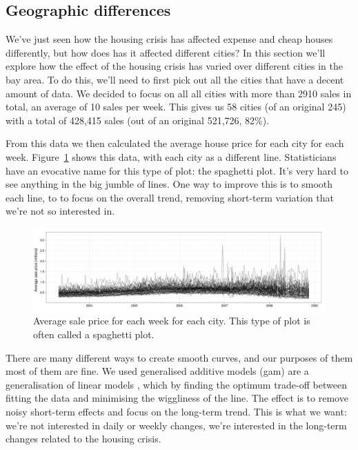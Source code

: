 \documentclass[oneside]{article}
\begin{document}
\subsection{Geographic differences}

We've just seen how the housing crisis has affected expense and cheap houses differently, but how does has it affected different cities?  In this section we'll explore how the effect of the housing crisis has varied over different cities in the bay area.  To do this, we'll need to first pick out all the cities that have a decent amount of data.  We decided to focus on all all cities with more than 2910 sales in total, an average of 10 sales per week.  This gives us 58 cities (of an original 245) with a total of 428,415 sales (out of an original 521,726, 82\%).  

From this data we then calculated the average house price for each city for each week.  Figure~\ref{fig:spaghetti} shows this data, with each city as a different line.  Statisticians have an evocative name for this type of plot: the spaghetti plot.  It's very hard to see anything in the big jumble of lines.  One way to improve this is to smooth each line, to to focus on the overall trend, removing short-term variation that we're not so interested in. 

\begin{figure}[htbp]
  \centering
    \includegraphics[width=0.9\linewidth]{cities-price}
  \caption{Average sale price for each week for each city.  This type of plot is often called a spaghetti plot.}
  \label{fig:spaghetti}
\end{figure}

There are many different ways to create smooth curves, and our purposes of them most of them are fine.  We used generalised additive models ({\sc gam}) are a generalisation of linear models \citep{wood:2006}, which by finding the optimum trade-off between fitting the data and minimising the wiggliness of the line.  The effect is to remove noisy short-term effects and focus on the long-term trend.  This is what we want: we're not interested in daily or weekly changes, we're interested in the long-term changes related to the housing crisis.
\end{document}
